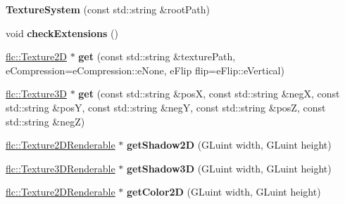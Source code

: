\begin{DoxyCompactItemize}
\item 
{\bfseries Texture\+System} (const std\+::string \&root\+Path)\hypertarget{classflw_1_1flf_1_1TextureSystem_aae79fbc26053626671070f7d0b607f30}{}\label{classflw_1_1flf_1_1TextureSystem_aae79fbc26053626671070f7d0b607f30}

\item 
void {\bfseries check\+Extensions} ()\hypertarget{classflw_1_1flf_1_1TextureSystem_adcb16801269c352a0ef7fecdf402002e}{}\label{classflw_1_1flf_1_1TextureSystem_adcb16801269c352a0ef7fecdf402002e}

\item 
\hyperlink{classflw_1_1flc_1_1Texture2D}{flc\+::\+Texture2D} $\ast$ {\bfseries get} (const std\+::string \&texture\+Path, e\+Compression=e\+Compression\+::e\+None, e\+Flip flip=e\+Flip\+::e\+Vertical)\hypertarget{classflw_1_1flf_1_1TextureSystem_ae8eef6850b2646ec9289964c596f13fe}{}\label{classflw_1_1flf_1_1TextureSystem_ae8eef6850b2646ec9289964c596f13fe}

\item 
\hyperlink{classflw_1_1flc_1_1Texture3D}{flc\+::\+Texture3D} $\ast$ {\bfseries get} (const std\+::string \&posX, const std\+::string \&negX, const std\+::string \&posY, const std\+::string \&negY, const std\+::string \&posZ, const std\+::string \&negZ)\hypertarget{classflw_1_1flf_1_1TextureSystem_a8fadccb0768c9b393b969f80f56e0bce}{}\label{classflw_1_1flf_1_1TextureSystem_a8fadccb0768c9b393b969f80f56e0bce}

\item 
\hyperlink{classflw_1_1flc_1_1Texture2DRenderable}{flc\+::\+Texture2\+D\+Renderable} $\ast$ {\bfseries get\+Shadow2D} (G\+Luint width, G\+Luint height)\hypertarget{classflw_1_1flf_1_1TextureSystem_a3c008aa31793c20817073cfa1f9ade44}{}\label{classflw_1_1flf_1_1TextureSystem_a3c008aa31793c20817073cfa1f9ade44}

\item 
\hyperlink{classflw_1_1flc_1_1Texture3DRenderable}{flc\+::\+Texture3\+D\+Renderable} $\ast$ {\bfseries get\+Shadow3D} (G\+Luint width, G\+Luint height)\hypertarget{classflw_1_1flf_1_1TextureSystem_a798cdc57fe106f0497146375f27eda3a}{}\label{classflw_1_1flf_1_1TextureSystem_a798cdc57fe106f0497146375f27eda3a}

\item 
\hyperlink{classflw_1_1flc_1_1Texture2DRenderable}{flc\+::\+Texture2\+D\+Renderable} $\ast$ {\bfseries get\+Color2D} (G\+Luint width, G\+Luint height)\hypertarget{classflw_1_1flf_1_1TextureSystem_a8aca62daea83c17c017aa4416570d8d9}{}\label{classflw_1_1flf_1_1TextureSystem_a8aca62daea83c17c017aa4416570d8d9}


\end{DoxyCompactItemize}
